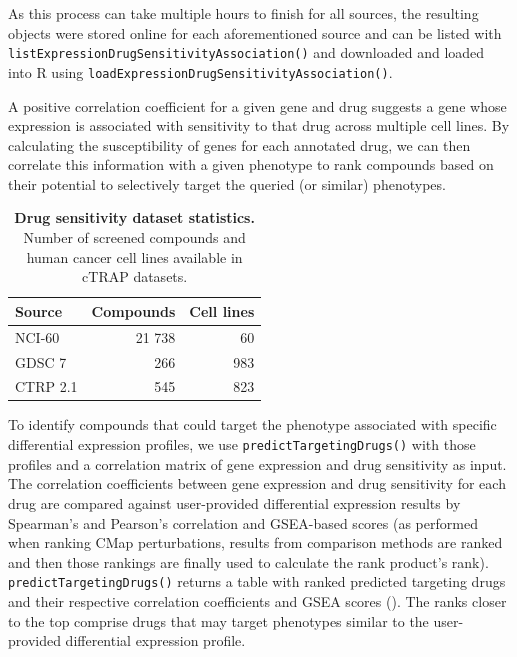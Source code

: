 As this process can take multiple hours to finish for all sources, the resulting objects were stored online for each aforementioned source and can be listed with \texttt{listExpressionDrugSensitivityAssociation()} and downloaded and loaded into R using \texttt{loadExpressionDrugSensitivityAssociation()}.

A positive correlation coefficient for a given gene and drug suggests a gene whose expression is associated with sensitivity to that drug across multiple cell lines. By calculating the susceptibility of genes for each annotated drug, we can then correlate this information with a given phenotype to rank compounds based on their potential to selectively target the queried (or similar) phenotypes.

\begin{table}
\centering
\parnotereset
\small
\caption[Drug sensitivity datasets statistics]{\textbf{Drug sensitivity dataset statistics.} Number of screened compounds and human cancer cell lines available in cTRAP datasets.}
\label{tab:drug-sensitivity-datasets}
\begin{tabularx}{.45\textwidth}{ l r r }
\toprule
\textbf{Source}   & \textbf{Compounds} & \textbf{Cell lines} \\
\midrule
NCI-60            &             21 738 &   60 \\
GDSC 7            &                266 &  983 \\
CTRP 2.1          &                545 &  823 \\
\bottomrule
\end{tabularx}
\parnotes
\end{table}

To identify compounds that could target the phenotype associated with specific differential expression profiles, we use \texttt{predictTargetingDrugs()} with those profiles and a correlation matrix of gene expression and drug sensitivity as input. The correlation coefficients between gene expression and drug sensitivity for each drug are compared against user-provided differential expression results by Spearman’s and Pearson’s correlation and GSEA-based scores (as performed when ranking CMap perturbations, results from comparison methods are ranked and then those rankings are finally used to calculate the rank product’s rank). \texttt{predictTargetingDrugs()} returns a table with ranked predicted targeting drugs and their respective correlation coefficients and GSEA scores (). The ranks closer to the top comprise drugs that may target phenotypes similar to the user-provided differential expression profile.


